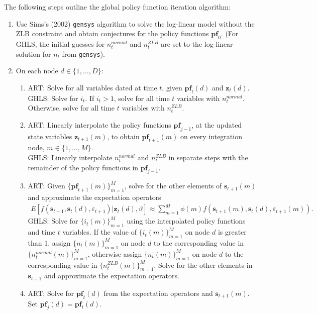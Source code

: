 \documentclass[12pt, final]{article}
\begin{document}
The following steps outline the global policy function iteration algorithm:

\begin{enumerate}
  \item Use Sims's (2002) \texttt{gensys} algorithm to solve the log-linear model without the ZLB constraint and obtain conjectures for the policy functions $\textbf{pf}_0$. (For GHLS, the initial guesses for $n_t^{normal}$ and $n_t^{ZLB}$ are set to the log-linear solution for $n_t$ from \texttt{gensys}).
  \item On each node $d \in \{1,\dots,D\}$:%
    \begin{enumerate}
    \item ART: Solve for all variables dated at time $t$, given $\textbf{pf}_t(d)$ and $\textbf{z}_t(d)$. \\
GHLS: Solve for $i_t$. If $i_t > 1$, solve for all time $t$ variables with $n_t^{normal}$. Otherwise, solve for all time $t$ variables with $n_t^{ZLB}$. 
    \item ART: Linearly interpolate the policy functions $\textbf{pf}_{j-1}$, at the updated state variables $\textbf{z}_{t+1}(m)$, to obtain $\textbf{pf}_{t+1}(m)$ on every integration node, $m \in \{1,\dots,M\}$.\\
GHLS: Linearly interpolate $n_t^{normal}$ and $n_t^{ZLB}$ in separate steps with the remainder of the policy functions in $\textbf{pf}_{j-1}$.
    \item ART: Given $\{\textbf{pf}_{t+1}(m)\}_{m=1}^M$, solve for the other elements of $\textbf{s}_{t+1}(m)$ and approximate the expectation operators
      \begin{gather*}
        E[f(\textbf{s}_{t+1},\textbf{s}_t(d),\varepsilon_{t+1})|\textbf{z}_t(d),\vartheta] \approx \sum_{m=1}^M \phi(m)f(\textbf{s}_{t+1}(m),\textbf{s}_t(d),\varepsilon_{t+1}(m)).
      \end{gather*}
GHLS: Solve for $\{i_t(m)\}_{m=1}^M$ using the interpolated policy functions and time $t$ variables. If the value of $\{i_t(m)\}_{m=1}^M$ on node $d$ is greater than 1, assign $\{n_t(m)\}_{m=1}^M$ on node $d$ to the corresponding value in $\{n_t^{normal}(m)\}_{m=1}^M$, otherwise assign $\{n_t(m)\}_{m=1}^M$ on node $d$ to the corresponding value in $\{n_t^{ZLB}(m)\}_{m=1}^M$. Solve for the other elements in $\textbf{s}_{t+1}$ and approximate the expectation operators.
      \item ART: Solve for $\textbf{pf}_t(d)$ from the expectation operators and $\textbf{s}_{t+1}(m)$. Set $\textbf{pf}_j(d) = \textbf{pf}_t(d)$.\\

\end{enumerate}
\end{enumerate}
\end{document}
